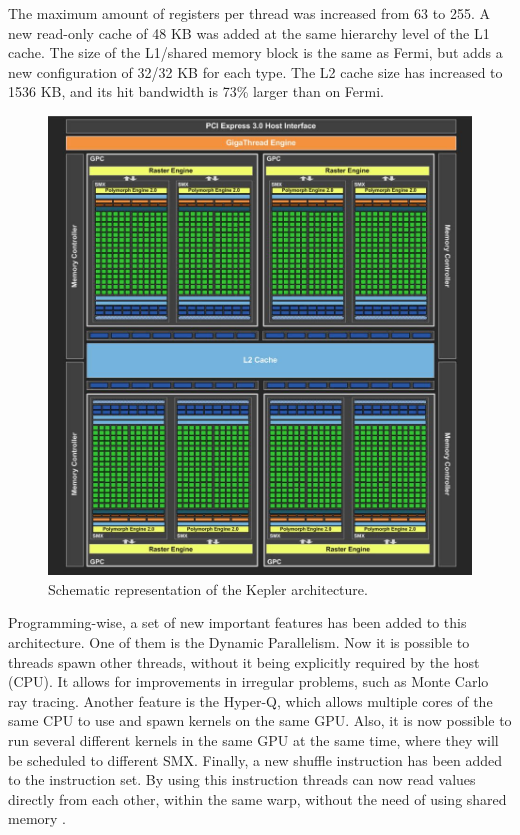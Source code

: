 The maximum amount of registers per \cuda thread was increased from 63 to 255. A new read-only cache of 48 KB was added at the same hierarchy level of the L1 cache. The size of the L1/shared memory block is the same as Fermi, but adds a new configuration of 32/32 KB for each type. The L2 cache size has increased to 1536 KB, and its hit bandwidth is 73\% larger than on Fermi.

\begin{figure}[!htp]
	\begin{center}
		\includegraphics[scale=0.4]{../../common/img/kepler_arch.jpg}
		\caption{Schematic representation of the \nvidia Kepler architecture.}
		\label{fig:kepler}
	\end{center}
\end{figure}

Programming-wise, a set of new important features has been added to this architecture. One of them is the Dynamic Parallelism. Now it is possible to \cuda threads spawn other threads, without it being explicitly required by the host (CPU). It allows for improvements in irregular problems, such as Monte Carlo ray tracing. Another feature is the Hyper-Q, which allows multiple cores of the same CPU to use and spawn kernels on the same GPU. Also, it is now possible to run several different kernels in the same GPU at the same time, where they will be scheduled to different SMX. Finally, a new shuffle instruction has been added to the instruction set. By using this instruction \cuda threads can now read values directly from each other, within the same warp, without the need of using shared memory \cite{NVIDIA:Kepler}.

